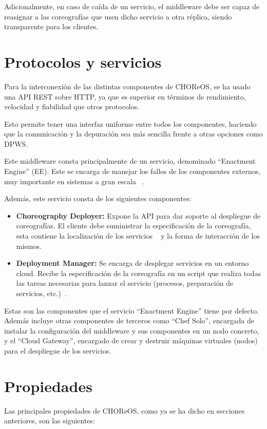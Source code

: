 \documentclass[runningheads]{llncs}
\begin{document}
Adicionalmente, en caso de caída de un servicio, el middleware debe ser capaz de reasignar a las coreografías que usen dicho servicio a otra réplica, siendo transparente para los clientes.
\section{Protocolos y servicios}
Para la interconexión de las distintas componentes de CHOReOS, se ha usado una API REST sobre HTTP, ya que es superior en términos de rendimiento, velocidad y fiabilidad que otros protocolos.~\cite{a_128}

Esto permite tener una interfaz uniforme entre todos los componentes, haciendo que la comunicación y la depuración sea más sencilla frente a otras opciones como DPWS. ~\cite{a_128}

Este middleware consta principalmente de un servicio, denominado ``Enactment Engine'' (EE). Este se encarga de manejar los fallos de los componentes externos, muy importante en sistemas a gran escala ~\cite{a_128}.

Además, este servicio consta de los siguientes componentes:

\begin{itemize}
    \item \textbf{Choreography Deployer: }Expone la API para dar soporte al despliegue de coreografías. El cliente debe suministrar la especificación de la coreografía, esta contiene la localización de los servicios ~\cite{a_128} y la forma de interacción de los mismos.
    \item \textbf{Deployment Manager: }Se encarga de desplegar servicios en un entorno cloud. Recibe la especificación de la coreografía en un script que realiza todas las tareas necesarias para lanzar el servicio (procesos, preparación de servicios, etc.)~\cite{a_128}.
\end{itemize}

Estas son las componentes que el servicio ``Enactment Engine'' tiene por defecto. Además incluye otras componentes de terceros como ``Chef Solo'', encargada de instalar la configuración del middleware y sus componentes en un nodo concreto, y el ``Cloud Gateway'', encargado de crear y destruir máquinas virtuales (nodos)~\cite{a_128} para el despliegue de los servicios.

\section{Propiedades}
Las principales propiedades de CHOReOS, como ya se ha dicho en secciones anteriores, son las siguientes:
\end{document}
